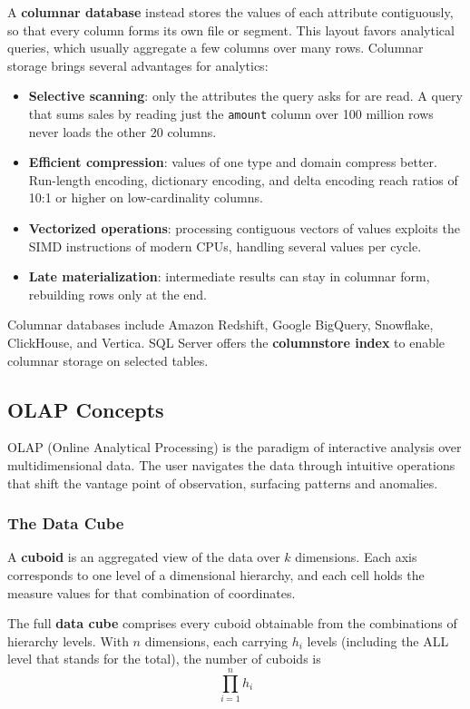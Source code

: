 A \textbf{columnar database} instead stores the values of each attribute contiguously, so that every column forms its own file or segment. This layout favors analytical queries, which usually aggregate a few columns over many rows. Columnar storage brings several advantages for analytics:
\begin{itemize}
    \item \textbf{Selective scanning}: only the attributes the query asks for are read. A query that sums sales by reading just the \texttt{amount} column over 100 million rows never loads the other 20 columns.
    \item \textbf{Efficient compression}: values of one type and domain compress better. Run-length encoding, dictionary encoding, and delta encoding reach ratios of 10:1 or higher on low-cardinality columns.
    \item \textbf{Vectorized operations}: processing contiguous vectors of values exploits the SIMD instructions of modern CPUs, handling several values per cycle.
    \item \textbf{Late materialization}: intermediate results can stay in columnar form, rebuilding rows only at the end.
\end{itemize}

Columnar databases include Amazon Redshift, Google BigQuery, Snowflake, ClickHouse, and Vertica. SQL Server offers the \textbf{columnstore index} to enable columnar storage on selected tables.

\subsection{OLAP Concepts}
\label{sec:olap-concepts}

OLAP (Online Analytical Processing) is the paradigm of interactive analysis over multidimensional data. The user navigates the data through intuitive operations that shift the vantage point of observation, surfacing patterns and anomalies.

\subsubsection{The Data Cube}
\label{subsec:data-cube}

A \textbf{cuboid} is an aggregated view of the data over $k$ dimensions. Each axis corresponds to one level of a dimensional hierarchy, and each cell holds the measure values for that combination of coordinates.

The full \textbf{data cube} comprises every cuboid obtainable from the combinations of hierarchy levels. With $n$ dimensions, each carrying $h_i$ levels (including the ALL level that stands for the total), the number of cuboids is
\[
\prod_{i=1}^{n} h_i
\]

